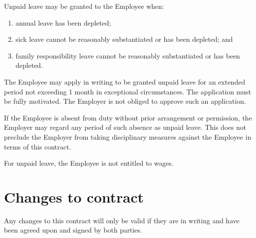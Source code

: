 \documentclass[a4paper,11pt]{article}
\begin{document}
\para Unpaid leave may be granted to the Employee when:

\begin{enumerate}

  \item annual leave has been depleted;

  \item sick leave cannot be reasonably substantiated or has been depleted; and

  \item family responsibility leave cannot be reasonably substantiated or has
    been depleted.

\end{enumerate}

\para The Employee may apply in writing to be granted unpaid leave for an
extended period not exceeding 1 month in exceptional circumstances. The
application must be fully motivated. The Employer is not obliged to approve
such an application.

\para If the Employee is absent from duty without prior arrangement or
permission, the Employer may regard any period of such absence as unpaid leave.
This does not preclude the Employer from taking disciplinary measures against
the Employee in terms of this contract.

\para For unpaid leave, the Employee is not entitled to wages.

\section{Changes to contract}
\label{changes}

\para Any changes to this contract will only be valid if they are in writing
and have been agreed upon and signed by both parties.

\pagebreak %

\rfoot{}
\end{document}

